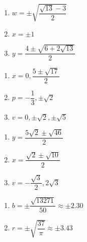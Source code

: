 \documentclass{ximera}
\begin{document}
\begin{multicols}{3}
\begin{enumerate}
\setcounter{enumi}{\value{HW}}

\item $w = \pm \sqrt{\dfrac{\sqrt{13} - 3}{2}}$
\item $x = \pm 1$
\item $y = \dfrac{4 \pm \sqrt{6 + 2 \sqrt{13}}}{2}$

\setcounter{HW}{\value{enumi}}
\end{enumerate}
\end{multicols}

\begin{multicols}{3}
\begin{enumerate}
\setcounter{enumi}{\value{HW}}

\item $x = 0, \dfrac{5 \pm \sqrt{17}}{2}$
\item $p = -\dfrac{1}{3}, \pm \sqrt{2}$ 
\item $v = 0, \pm \sqrt{2}, \pm \sqrt{5}$

\setcounter{HW}{\value{enumi}}
\end{enumerate}
\end{multicols}



\begin{multicols}{3}
\begin{enumerate}
\setcounter{enumi}{\value{HW}}

\item $y = \dfrac{5\sqrt{2} \pm \sqrt{46}}{2}$
\item $x = \dfrac{\sqrt{2} \pm \sqrt{10}}{2}$
\item $v = -\dfrac{\sqrt{3}}{2}, 2\sqrt{3}$

\setcounter{HW}{\value{enumi}}
\end{enumerate}
\end{multicols}


\begin{multicols}{2}
\begin{enumerate}
\setcounter{enumi}{\value{HW}}

\item $b = \pm \dfrac{\sqrt{13271}}{50} \approx \pm 2.30$
\item $r = \pm \sqrt{\dfrac{37}{\pi}} \approx \pm 3.43$ 



\setcounter{HW}{\value{enumi}}
\end{enumerate}
\end{multicols}
\end{document}
